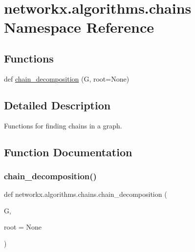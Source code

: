 \hypertarget{namespacenetworkx_1_1algorithms_1_1chains}{}\section{networkx.\+algorithms.\+chains Namespace Reference}
\label{namespacenetworkx_1_1algorithms_1_1chains}
\subsection*{Functions}
\begin{DoxyCompactItemize}
\item 
def \hyperlink{namespacenetworkx_1_1algorithms_1_1chains_ada17c05ea0330fe0e470b999734e95ac}{chain\+\_\+decomposition} (G, root=None)
\end{DoxyCompactItemize}


\subsection{Detailed Description}
\begin{DoxyVerb}Functions for finding chains in a graph.\end{DoxyVerb}
 

\subsection{Function Documentation}
\mbox{\label{namespacenetworkx_1_1algorithms_1_1chains_ada17c05ea0330fe0e470b999734e95ac}} 
\subsubsection{\texorpdfstring{chain\+\_\+decomposition()}{chain\_decomposition()}}
{\footnotesize\ttfamily def networkx.\+algorithms.\+chains.\+chain\+\_\+decomposition (\begin{DoxyParamCaption}\item[{}]{G,  }\item[{}]{root = {\ttfamily None} }\end{DoxyParamCaption})}

